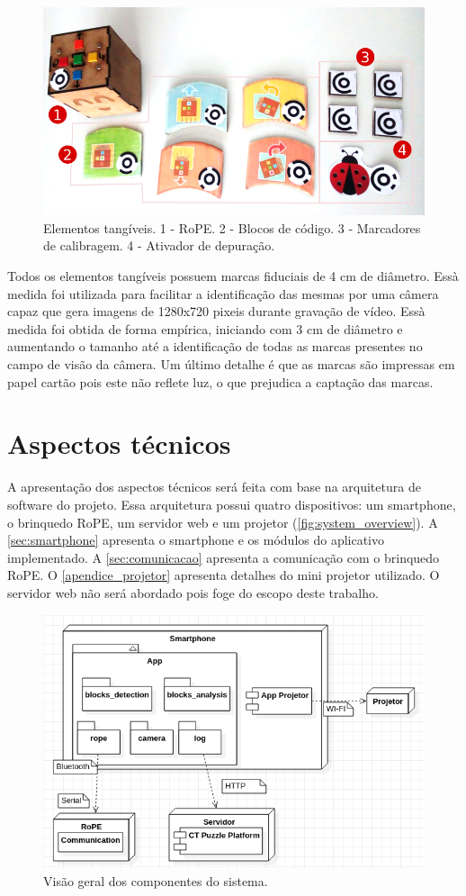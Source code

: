 \begin{figure}[!h]
\centering
        \includegraphics[width=.9\linewidth,fbox]{figs/tangible_elements.png}
        \caption{Elementos tangíveis. 1 - RoPE. 2 - Blocos de código. 3 - Marcadores de calibragem. 4 - Ativador de depuração.}
        \label{fig:tangible_elements}
\end{figure}
Todos os elementos tangíveis possuem marcas fiduciais de 4 cm de diâmetro. Essà medida foi utilizada para facilitar a identificação das mesmas por uma câmera capaz que gera imagens de 1280x720 pixeis durante gravação de vídeo. Essà medida foi obtida de forma empírica, iniciando com 3 cm de diâmetro e aumentando o tamanho até a identificação de todas as marcas presentes no campo de visão da câmera. Um último detalhe é que as marcas são impressas em papel cartão pois este não reflete luz, o que prejudica a captação das marcas.

\section{Aspectos técnicos}
\label{sec:detalhes_tecnicos}
A apresentação dos aspectos técnicos será feita com base na arquitetura de software do projeto. Essa arquitetura possui quatro dispositivos: um smartphone, o brinquedo RoPE, um servidor web e um projetor (\autoref{fig:system_overview}).  A \autoref{sec:smartphone} apresenta o smartphone e os módulos do aplicativo implementado. A \autoref{sec:comunicacao} apresenta a comunicação com o brinquedo RoPE. O \autoref{apendice_projetor} apresenta detalhes do mini projetor utilizado. O servidor web não será abordado pois foge do escopo deste trabalho.

\begin{figure}[!h]
    \centering
    \includegraphics[width=.8\linewidth,fbox]{figs/system_overview.png}
    \caption{Visão geral dos componentes do sistema.}
    \label{fig:system_overview}
\end{figure}

